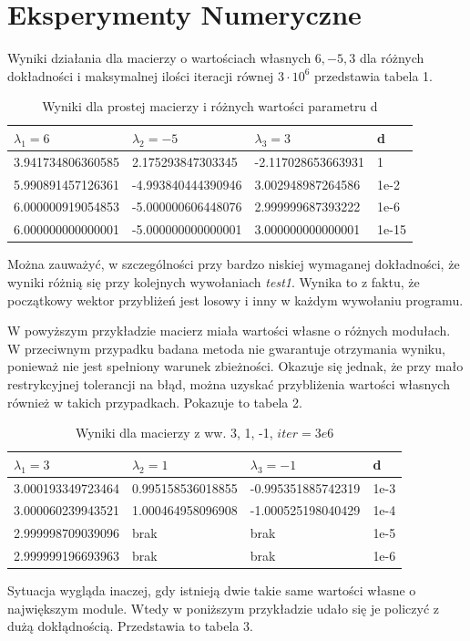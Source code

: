 \documentclass[a4paper,12pt]{article}
\begin{document}
\section*{Eksperymenty Numeryczne}
Wyniki działania dla macierzy o wartościach własnych ${6, -5, 3}$ dla różnych dokładności i maksymalnej ilości iteracji równej $3\cdot 10^6$ przedstawia tabela 1.
\begin{table}[h!]
    \centering
\begin{tabular}{|l|l|l|l|}
\hline
$\lambda_1 = 6$                & $\lambda_2 = -5$                 & $\lambda_3 = 3$                 & d      \\
\hline
3.941734806360585          &    2.175293847303345           & -2.117028653663931           & 1      \\
\hline
5.990891457126361            &   -4.993840444390946           &    3.002948987264586           & 1e-2    \\
\hline
6.000000919054853 & -5.000000606448076 & 2.999999687393222 & 1e-6    \\
\hline
6.000000000000001 & -5.000000000000001 & 3.000000000000001 & 1e-15  
\\
\hline
\end{tabular}
    \caption{Wyniki dla prostej macierzy i różnych wartości parametru d}
    \label{tab:my_label}
\end{table}
Można zauważyć, w szczególności przy bardzo niskiej wymaganej dokładności, że wyniki różnią się przy kolejnych wywołaniach \emph{test1}. Wynika to z faktu, że początkowy wektor przybliżeń jest losowy i inny w każdym wywołaniu programu. 

W powyższym przykładzie macierz miała wartości własne o różnych modułach. W przeciwnym przypadku badana metoda nie gwarantuje otrzymania wyniku, ponieważ nie jest spełniony warunek zbieżności. Okazuje się jednak, że przy mało restrykcyjnej tolerancji na błąd, można uzyskać przybliżenia wartości własnych również w takich przypadkach. Pokazuje to tabela 2.

\begin{table}[H]
    \centering
\begin{tabular}{|l|l|l|l|}
\hline
$\lambda_1 = 3$                & $\lambda_2 = 1$                 & $\lambda_3 = -1$                 & d      \\
\hline
3.000193349723464 & 0.995158536018855 & -0.995351885742319 & 1e-3 \\
\hline
3.000060239943521 & 1.000464958096908 & -1.000525198040429 & 1e-4 \\
\hline
2.999998709039096 & brak              & brak               & 1e-5 \\
\hline
2.999999196693963 & brak              & brak               & 1e-6 \\
\hline
\end{tabular}
    \caption{Wyniki dla macierzy z ww. 3, 1, -1, $iter = 3e6$}
    \label{tab:my_label2}
\end{table}
\vspace{-6mm}%
Sytuacja wygląda inaczej, gdy istnieją dwie takie same wartości własne o największym module. Wtedy w poniższym przykładzie udało się je policzyć z dużą dokłądnością. Przedstawia to tabela 3. 
\end{document}
